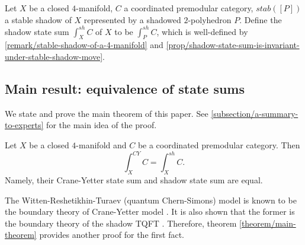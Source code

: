 
\begin{definition}\label{def/shadow-state-sum-of-a-4-manifold}
  Let $X$ be a closed $4$-manifold, $C$ a coordinated premodular
  category, $stab([P])$ a stable shadow of $X$ represented by a
  shadowed $2$-polyhedron $P$. Define the shadow state sum
  $\int_{X}^{sh} C$ of $X$ to be $\int_{P}^{sh} C$, which is
  well-defined by \ref{remark/stable-shadow-of-a-4-manifold} and
  \ref{prop/shadow-state-sum-is-invariant-under-stable-shadow-move}.
\end{definition}

\subsection{Main result: equivalence of state sums}

\noindent We state and prove the main theorem of this paper. See
\ref{subsection/a-summary-to-experts} for the main idea of the
proof.

\begin{theorem}\label{theorem/main-theorem}
  Let $X$ be a closed $4$-manifold and $C$ be a coordinated
  premodular category. Then
  $$\int^{CY}_{X}C = \int^{sh}_{X} C.$$
  Namely, their Crane-Yetter state sum and shadow state sum are
  equal.
\end{theorem}

\begin{remark}
  The Witten-Reshetikhin-Turaev (quantum Chern-Simons) model is
  known to be the boundary theory of Crane-Yetter model
  \cite{barrett/observables-in-tv-and-cy} \cite{tham/phd-thesis}.
  It is also shown that the former is the boundary theory of the
  shadow TQFT \cite[X.3.2 \& theorem
  X.3.3]{turaev-qiok-3-manifolds}. Therefore, theorem
  \ref{theorem/main-theorem} provides another proof for the first
  fact.
\end{remark}

